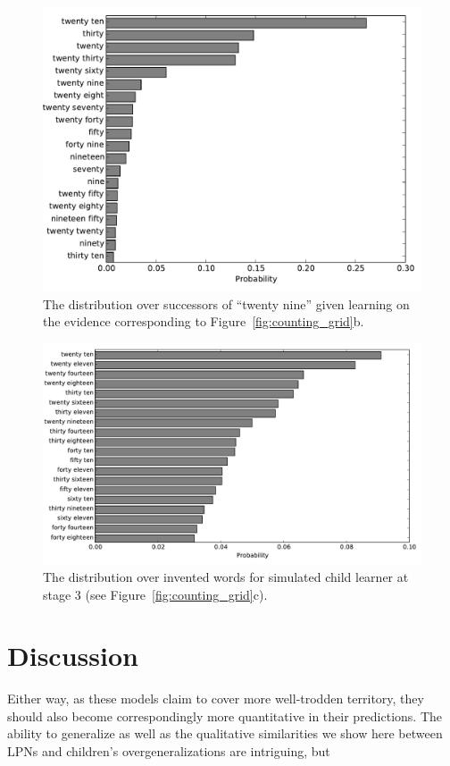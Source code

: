 \documentclass[10pt,letterpaper]{article}
\begin{document}
\begin{figure}[t]
\includegraphics[width=0.9\linewidth]{figures/after29}
\caption{The distribution over successors of ``twenty nine'' given learning on the evidence corresponding to Figure~\ref{fig:counting_grid}b. \label{fig:after29}}
\end{figure}


\begin{figure}[t]
\includegraphics[width=0.9\linewidth]{figures/inventedWords}
\caption{The distribution over invented words for simulated child
  learner at stage
  3 (see Figure~\ref{fig:counting_grid}c). \label{fig:inventedWords}}
\end{figure}


\section{Discussion}


Either way, as these models claim to cover more well-trodden
territory, they should also become correspondingly more quantitative
in their predictions. The ability to generalize as well as the
qualitative similarities we show here between LPNs and children's
overgeneralizations are intriguing, but 
\end{document}
